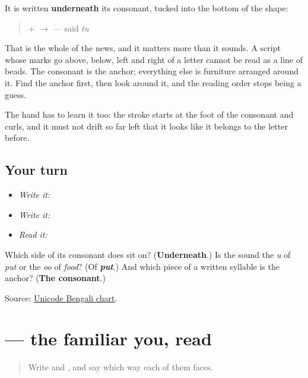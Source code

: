 It is written \textbf{underneath} its consonant, tucked into the bottom of the shape:

\begin{quote}
\textbf{} + \textbf{} $\to$ \textbf{} — said \emph{tu}
\end{quote}

That is the whole of the news, and it matters more than it sounds. A script whose marks go above, below, left and right of a letter cannot be read as a line of beads. The consonant is the anchor; everything else is furniture arranged around it. Find the anchor first, then look around it, and the reading order stops being a guess.

The hand has to learn it too: the stroke starts at the foot of the consonant and curls, and it must not drift so far left that it looks like it belongs to the letter before.

\subsection*{Your turn}
\begin{itemize}
\raggedright
  \item \emph{Write it:} 
  \item \emph{Write it:} 
  \item \emph{Read it:} 
\end{itemize}

\begin{tcolorbox}[breakable,colback=teal!4,colframe=teal!35!black,title={Before you move on}]
Which side of its consonant does \textbf{} sit on? (\textbf{Underneath}.) Is the sound the \emph{u} of \emph{put} or the \emph{oo} of \emph{food}? (Of \emph{\textbf{put}}.) And which piece of a written syllable is the anchor? (\textbf{The consonant}.)

Source: \href{https://www.unicode.org/charts/PDF/U0980.pdf}{Unicode Bengali chart}.
\end{tcolorbox}
\section[\texorpdfstring{\bn{তুমি} (tumi)}{তুমি (tumi)}]{ — the familiar you, read}

\label{lesson:BN-W02-tumi-read}



\begin{quote}
Write \textbf{} and \textbf{}, and say which way each of them faces.
\end{quote}

